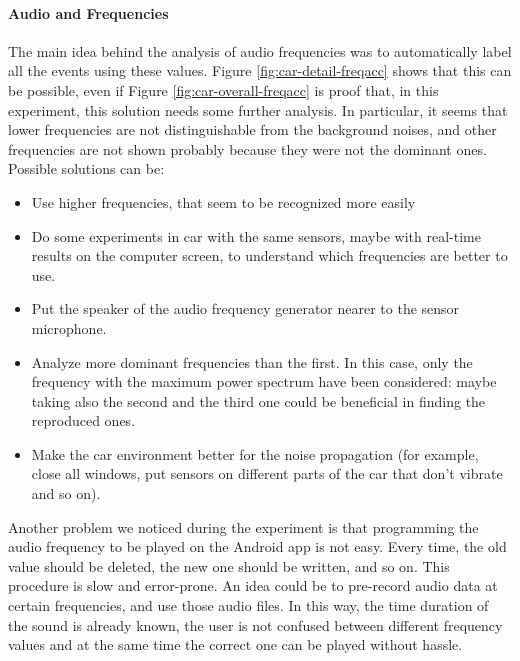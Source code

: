 \paragraph{Audio and Frequencies} The main idea behind the analysis of audio frequencies was to automatically label all the events using these values. Figure \ref{fig:car-detail-freqacc} shows that this can be possible, even if Figure \ref{fig:car-overall-freqacc} is proof that, in this experiment, this solution needs some further analysis. In particular, it seems that lower frequencies are not distinguishable from the background noises, and other frequencies are not shown probably because they were not the dominant ones. Possible solutions can be:
\begin{itemize}
    \item Use higher frequencies, that seem to be recognized more easily
    \item Do some experiments in car with the same sensors, maybe with real-time results on the computer screen, to understand which frequencies are better to use.
    \item Put the speaker of the audio frequency generator nearer to the sensor microphone.
    \item Analyze more dominant frequencies than the first. In this case, only the frequency with the maximum power spectrum have been considered: maybe taking also the second and the third one could be beneficial in finding the reproduced ones. 
    \item Make the car environment better for the noise propagation (for example, close all windows, put sensors on different parts of the car that don't vibrate and so on).
\end{itemize}
Another problem we noticed during the experiment is that programming the audio frequency to be played on the Android app is not easy. Every time, the old value should be deleted, the new one should be written, and so on. This procedure is slow and error-prone. An idea could be to pre-record audio data at certain frequencies, and use those audio files. In this way, the time duration of the sound is already known, the user is not confused between different frequency values and at the same time the correct one can be played without hassle.  
